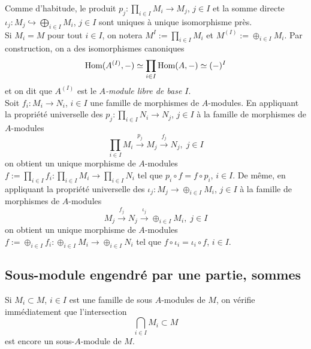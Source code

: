 \documentclass[a4paper, 12pt]{amsart}
\begin{document}
  Comme d'habitude, le produit $p_{j}:\prod_{i\in I}M_{i}\rightarrow M_{j}$, $j\in I$ et la somme directe $\iota_{j}:M_{j}\hookrightarrow \bigoplus_{i\in I}M_{i}$, $j\in I$ sont uniques à unique isomorphisme près. \\

 


 Si $M_{i}=M$ pour tout $i\in I$, on notera $M^{I}:=\prod_{i\in I}M_{i}$ et $M^{(I)}:=\oplus_{i\in I}M_{i}$. Par construction, on a des isomorphismes   canoniques
$$ \hbox{\rm Hom}(A^{(I)},-)\simeq \prod_{i\in I}\hbox{\rm Hom}(A,-)\simeq (-)^{I}$$
et on dit que $A^{(I)}$ est le \textit{$A$-module libre de base $I$}.\\


 Soit $f_i:M_i\rightarrow N_i$, $i\in I$ une famille de morphismes de $A$-modules. En appliquant la propriété universelle des $p_j:\prod_{i\in I}N_i\rightarrow N_j$, $j\in I$ à la famille de morphismes de $A$-modules 
$$ \prod_{i\in I}M_i\stackrel{p_j}{\rightarrow}M_j\stackrel{f_j}{\rightarrow} N_j,\; j\in I$$
on obtient un unique morphisme de $A$-modules $f:=\prod_{i\in I}f_i:\prod_{i\in I}M_i\rightarrow \prod_{i\in I}N_i$ tel que $p_i\circ f=f\circ p_i$, $i\in I$.   De même,  en appliquant la propriété universelle des $\iota_j:M_j\rightarrow \oplus_{i\in I}M_i$, $j\in I$ à la famille de morphismes de $A$-modules 
$$ M_j\stackrel{f_j}{\rightarrow}N_j\stackrel{\iota_j}{\rightarrow} \oplus_{i\in I}M_i,\; j\in I$$
on obtient un unique morphisme de $A$-modules $f:=\oplus_{i\in I}f_i:\oplus_{i\in I}M_i\rightarrow \oplus_{i\in I}N_i$ tel que $  f\circ \iota_i=  \iota_i\circ f$, $i\in I$.  

\subsection{Sous-module engendré par une partie, sommes}  Si $M_{i}\subset M$, $i\in I$ est une famille de sous $A$-modules de $M$, on vérifie immédiatement que l'intersection $$\bigcap_{i\in I}M_{i}\subset M$$ est encore un sous-$A$-module de $M$.\\
\end{document}
